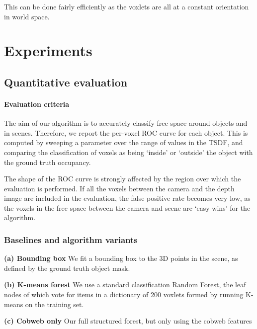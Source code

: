 \documentclass[10pt,twocolumn,letterpaper]{article}
\begin{document}
This can be done fairly efficiently as the voxlets are all at a constant orientation in world space.


\section{Experiments}


\subsection{Quantitative evaluation}

\paragraph{Evaluation criteria}
The aim of our algorithm is to accurately classify free space around objects and in scenes.
Therefore, we report the per-voxel ROC curve for each object.
This is computed by sweeping a parameter over the range of values in the TSDF, and comparing the classification of voxels as being `inside' or `outside' the object with the ground truth occupancy.

The shape of the ROC curve is strongly affected by the region over which the evaluation is performed.
If all the voxels between the camera and the depth image are included in the evaluation, the false positive rate becomes very low, as the voxels in the free space between the camera and scene are `easy wins' for the algorithm. 


\subsubsection{Baselines and algorithm variants}

\noindent \textbf{(a) Bounding box} We fit a bounding box to the 3D points in the scene, as defined by the ground truth object mask.

\noindent \textbf{(b) K-means forest} We use a standard classification Random Forest, the leaf nodes of which vote for items in a dictionary of 200 voxlets formed by running K-means on the training set.

\noindent \textbf{(c) Cobweb only} Our full structured forest, but only using the cobweb features
\end{document}
